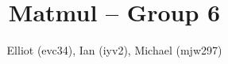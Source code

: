 \documentclass{hw}
\title{Matmul -- Group 6}
\author{Elliot (evc34), Ian (iyv2), Michael (mjw297)}
\newcommand{\mat}[3]{}
\begin{document}
\maketitle
\begin{gather*}
  \mat{a}{2}{3} \\
  \mat{b'}{8}{2} \\
\end{gather*}
\end{document}
